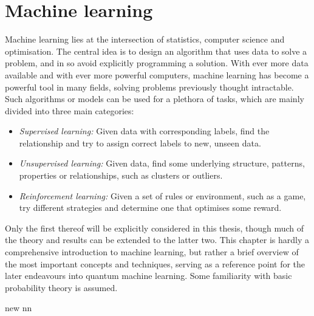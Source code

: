 \chapter{Machine learning}
\label{chap:ml}

Machine learning lies at the intersection of statistics, computer science and optimisation.
The central idea is to design an algorithm that uses data to solve a problem, and in so avoid explicitly programming a solution.
With ever more data available and with ever more powerful computers, machine learning has become a powerful tool in many fields, solving problems previously thought intractable.
Such algorithms or models can be used for a plethora of tasks, which are mainly divided into three main categories:
\begin{itemize}

    \item
          \textit{Supervised learning:} Given data with corresponding labels, find the relationship and try to assign correct labels to new, unseen data.

    \item
          \textit{Unsupervised learning:} Given data, find some underlying structure, patterns, properties or relationships, such as clusters or outliers.

    \item
          \textit{Reinforcement learning:} Given a set of rules or environment, such as a game, try different strategies and determine one that optimises some reward.

\end{itemize}
Only the first thereof will be explicitly considered in this thesis, though much of the theory and results can be extended to the latter two.
This chapter is hardly a comprehensive introduction to machine learning, but rather a brief overview of the most important concepts and techniques, serving as a reference point for the later endeavours into quantum machine learning.
Some familiarity with basic probability theory is assumed.

{new}
{nn}